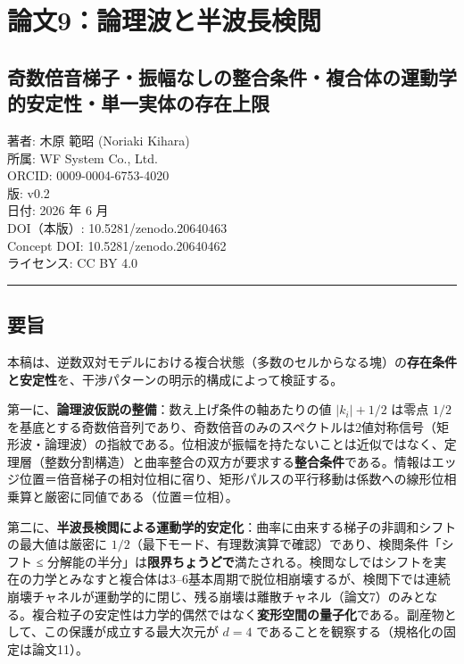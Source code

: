 \documentclass[
]{ltjsarticle}
\author{}
\date{}
\begin{document}
\section{論文9：論理波と半波長検閲}\label{ux8ad6ux65879ux8ad6ux7406ux6ce2ux3068ux534aux6ce2ux9577ux691cux95b2}

\subsection{奇数倍音梯子・振幅なしの整合条件・複合体の運動学的安定性・単一実体の存在上限}\label{ux5947ux6570ux500dux97f3ux68afux5b50ux632fux5e45ux306aux3057ux306eux6574ux5408ux6761ux4ef6ux8907ux5408ux4f53ux306eux904bux52d5ux5b66ux7684ux5b89ux5b9aux6027ux5358ux4e00ux5b9fux4f53ux306eux5b58ux5728ux4e0aux9650}

著者: 木原 範昭 (Noriaki Kihara)\\
所属: WF System Co., Ltd.\\
ORCID: 0009-0004-6753-4020\\
版: v0.2\\
日付: 2026 年 6 月\\
DOI（本版）: 10.5281/zenodo.20640463\\
Concept DOI: 10.5281/zenodo.20640462\\
ライセンス: CC BY 4.0

\begin{center}\rule{0.5\linewidth}{0.5pt}\end{center}

\subsection{要旨}\label{ux8981ux65e8}

本稿は、逆数双対モデルにおける複合状態（多数のセルからなる塊）の\textbf{存在条件と安定性}を、干渉パターンの明示的構成によって検証する。

第一に、\textbf{論理波仮説の整備}：数え上げ条件の軸あたりの値
\(|k_i|+1/2\) は零点 \(1/2\)
を基底とする奇数倍音列であり、奇数倍音のみのスペクトルは2値対称信号（矩形波・論理波）の指紋である。位相波が振幅を持たないことは近似ではなく、定理層（整数分割構造）と曲率整合の双方が要求する\textbf{整合条件}である。情報はエッジ位置＝倍音梯子の相対位相に宿り、矩形パルスの平行移動は係数への線形位相乗算と厳密に同値である（位置＝位相）。

第二に、\textbf{半波長検閲による運動学的安定化}：曲率に由来する梯子の非調和シフトの最大値は厳密に
\(1/2\)（最下モード、有理数演算で確認）であり、検閲条件「シフト ≤
分解能の半分」は\textbf{限界ちょうどで}満たされる。検閲なしではシフトを実在の力学とみなすと複合体は3--6基本周期で脱位相崩壊するが、検閲下では連続崩壊チャネルが運動学的に閉じ、残る崩壊は離散チャネル（論文7）のみとなる。複合粒子の安定性は力学的偶然ではなく\textbf{変形空間の量子化}である。副産物として、この保護が成立する最大次元が
\(d=4\) であることを観察する（規格化の固定は論文11）。
\end{document}
